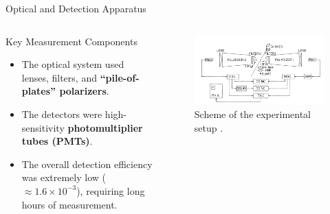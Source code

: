 \begin{frame}{Optical and Detection Apparatus}
  
  \begin{columns}[T]
    \begin{column}{0.6\textwidth}
      \begin{block}{Key Measurement Components}
        \begin{itemize}[<+->]
          \item The optical system used lenses, filters, and \textbf{``pile-of-plates'' polarizers}.
          \item The detectors were high-sensitivity \textbf{photomultiplier tubes (PMTs)}.
          \item The overall detection efficiency was extremely low ($\approx 1.6 \times 10^{-3} $), requiring long hours of measurement.
        \end{itemize}
      \end{block}
    \end{column}
    
    \begin{column}{0.4\textwidth}
      \begin{figure}
        \centering
        \includegraphics[width=\linewidth, height=0.7\textheight, keepaspectratio]{images/clauster.png}
        \caption{Scheme of the experimental setup \cite{freedman_experimental_1972}.}
      \end{figure}
    \end{column}
  \end{columns}

\end{frame}

